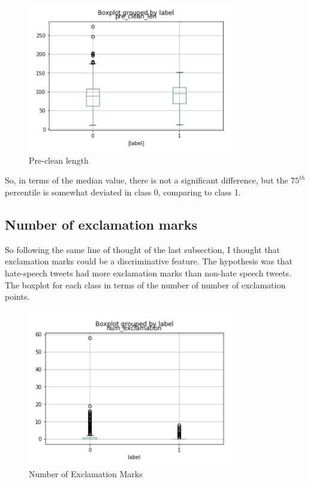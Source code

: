\documentclass{article}
\begin{document}
	\begin{figure}[h]
		\label{Figure 1}
		\caption{Pre-clean length}
		\includegraphics[width=9cm]{precleanl.png}
		\centering
	\end{figure}
	
	So, in terms of the median value, there is not a significant difference, but the $75^{th}$ percentile is somewhat deviated in class 0, comparing to class 1.  
	
	\subsection{Number of exclamation marks}
	
	So following the same line of thought of the last subsection, I thought that exclamation marks could be a discriminative feature. The hypothesis was that hate-speech tweets had more exclamation marks than non-hate speech tweets. The boxplot for each class in terms of the number of number of exclamation points. 
	
	\begin{figure}[h]
		\label{Figure 2}
		\caption{Number of Exclamation Marks}
		\includegraphics[width=9cm]{postcleanlength.png}
		\centering
	\end{figure}
	
\end{document}
